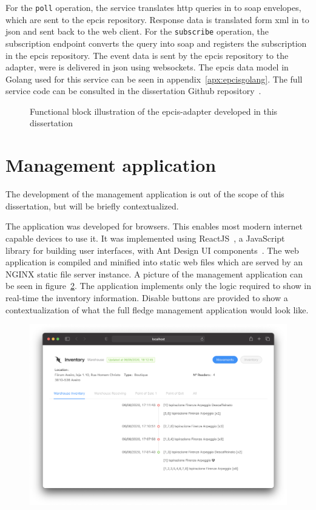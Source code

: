 For the \texttt{poll} operation, the service translates \ac{http} queries in to \ac{soap} envelopes, which are sent to the \ac{epcis} repository. Response data is translated form \ac{xml} in to \ac{json} and sent back to the web client. 
For the \texttt{subscribe} operation, the subscription endpoint converts the query into \ac{soap} and registers the subscription in the \ac{epcis} repository. The event data is sent by the \ac{epcis} repository to the adapter, were is delivered in \ac{json} using websockets.
The \ac{epcis} data model in Golang used for this service can be seen in appendix~\ref{apx:epcisgolang}. The full service code can be consulted in the dissertation Github repository~\cite{DvcorreiaEpcsmartshelve}.

\begin{figure}
  \centering
  \caption{Functional block illustration of the \acs{epcis}-adapter developed in this dissertation}
  \label{fig:epcisadapter}
\end{figure}

\section{Management application}

The development of the management application is out of the scope of this dissertation, but will be briefly contextualized.

The application was developed for browsers. This enables most modern internet capable devices to use it.
It was implemented using ReactJS~\cite{ReactJavaScriptLibrary}, a JavaScript library for building user interfaces, with Ant Design UI components~\cite{AntDesignWorld}. The web application is compiled and minified into static web files which are served by an NGINX static file server instance.
A picture of the management application can be seen in figure~\ref{fig:webinterface}.
The application implements only the logic required to show in real-time the inventory information. Disable buttons are provided to show a contextualization of what the full fledge management application would look like.

\begin{figure}[h]
  \centering
  \includegraphics[width=\textwidth]{figs/webmanagement.png}
  \caption{}
  \label{fig:webinterface}
\end{figure}